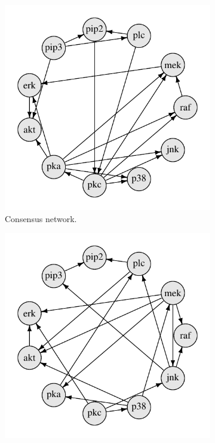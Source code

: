 \documentclass[article]{jss}
\renewcommand{\|}{\,|\,}
\begin{document}
\begin{figure}[t!]
\centering
\begin{subfigure}[b]{0.32\textwidth}
\includegraphics[width=\textwidth]{cyto-true.pdf}
\caption{Consensus network.}
\label{fig:cytoresults:consensus}
\end{subfigure}
\begin{subfigure}[b]{0.32\textwidth}
\includegraphics[width=\textwidth]{cyto-cts.pdf}

\end{subfigure}
\end{figure}
\end{document}

